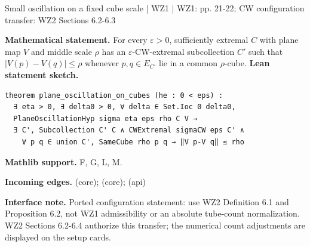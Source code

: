 \documentclass[10pt,a4paper]{article}
\newcommand{\nodecard}[1]{\hyperlink{node-#1}{\texttt{\detokenize{#1}}}}
\begin{document}
\begin{minipage}{\linewidth}
\hypertarget{node-L4_5}{}
\begin{tcolorbox}[colback=white,colframe=planefg,colbacktitle=planebg,coltitle=ink,boxrule=0.45pt,arc=1.6mm,left=3mm,right=3mm,top=2mm,bottom=2mm,title={\sffamily\bfseries WZ1 Lemma 4.5 / CW \hfill \texttt{L4\_5}}]
{\sffamily\small\color{muted}Small oscillation on a fixed cube scale | WZ1 | WZ1: pp. 21-22; CW configuration transfer: WZ2 Sections 6.2-6.3}\par
\textbf{Mathematical statement.} For every $\varepsilon>0$, sufficiently extremal $C$ with plane map $V$ and middle scale $\rho$ has an $\varepsilon$-CW-extremal subcollection $C'$ such that
$|V(p)-V(q)|\le\rho$ whenever $p,q\in E_{C'}$ lie in a common $\rho$-cube.
\smallskip\textbf{Lean statement sketch.}
\begin{Verbatim}[fontsize=\small,breaklines=true,breakanywhere=true,tabsize=2]
theorem plane_oscillation_on_cubes (he : 0 < eps) :
  ∃ eta > 0, ∃ delta0 > 0, ∀ delta ∈ Set.Ioc 0 delta0,
  PlaneOscillationHyp sigma eta eps rho C V →
  ∃ C', Subcollection C' C ∧ CWExtremal sigmaCW eps C' ∧
    ∀ p q ∈ union C', SameCube rho p q → ‖V p-V q‖ ≤ rho
\end{Verbatim}
{\footnotesize\textbf{Mathlib support.} F, G, L, M.\par
\textbf{Incoming edges.} \nodecard{L3_4} (core); \nodecard{W2P6_2} (core); \nodecard{Dplane} (api)\par}
{\footnotesize\textbf{Interface note.}  Ported configuration statement: use WZ2 Definition 6.1 and Proposition 6.2, not WZ1 admissibility or an absolute tube-count normalization. WZ2 Sections 6.2-6.4 authorize this transfer; the numerical count adjustments are displayed on the setup cards.}
\end{tcolorbox}\end{minipage}\par\medskip
\end{document}
